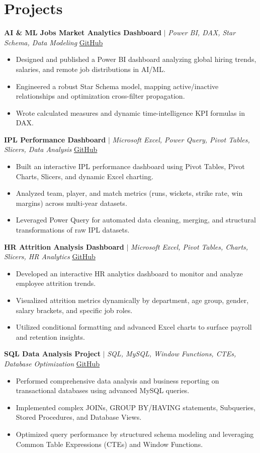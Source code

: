 \documentclass[a4paper,9pt]{article}
\newcommand{\resumeItem}[1]{\item\small #1}
\begin{document}
\vspace{-2mm}

\section{Projects}

\noindent\textbf{AI \& ML Jobs Market Analytics Dashboard} $|$ \textit{Power BI, DAX, Star Schema, Data Modeling} \hfill
\href{https://github.com/hsachan295-source/Power-BI-Portfolio}{\small GitHub}
\begin{itemize}
\resumeItem{Designed and published a Power BI dashboard analyzing global hiring trends, salaries, and remote job distributions in AI/ML.}
\resumeItem{Engineered a robust Star Schema model, mapping active/inactive relationships and optimization cross-filter propagation.}
\resumeItem{Wrote calculated measures and dynamic time-intelligence KPI formulas in DAX.}
\end{itemize}

\vspace{1.5pt}
\noindent\textbf{IPL Performance Dashboard} $|$ \textit{Microsoft Excel, Power Query, Pivot Tables, Slicers, Data Analysis} \hfill
\href{https://github.com/hsachan295-source/Power-BI-Portfolio}{\small GitHub}
\begin{itemize}
\resumeItem{Built an interactive IPL performance dashboard using Pivot Tables, Pivot Charts, Slicers, and dynamic Excel charting.}
\resumeItem{Analyzed team, player, and match metrics (runs, wickets, strike rate, win margins) across multi-year datasets.}
\resumeItem{Leveraged Power Query for automated data cleaning, merging, and structural transformations of raw IPL datasets.}
\end{itemize}

\vspace{1.5pt}
\noindent\textbf{HR Attrition Analysis Dashboard} $|$ \textit{Microsoft Excel, Pivot Tables, Charts, Slicers, HR Analytics} \hfill
\href{https://github.com/hsachan295-source/Power-BI-Portfolio}{\small GitHub}
\begin{itemize}
\resumeItem{Developed an interactive HR analytics dashboard to monitor and analyze employee attrition trends.}
\resumeItem{Visualized attrition metrics dynamically by department, age group, gender, salary brackets, and specific job roles.}
\resumeItem{Utilized conditional formatting and advanced Excel charts to surface payroll and retention insights.}
\end{itemize}

\vspace{1.5pt}
\noindent\textbf{SQL Data Analysis Project} $|$ \textit{SQL, MySQL, Window Functions, CTEs, Database Optimization} \hfill
\href{https://github.com/hsachan295-source/smart-business-dashboard}{\small GitHub}
\begin{itemize}
\resumeItem{Performed comprehensive data analysis and business reporting on transactional databases using advanced MySQL queries.}
\resumeItem{Implemented complex JOINs, GROUP BY/HAVING statements, Subqueries, Stored Procedures, and Database Views.}
\resumeItem{Optimized query performance by structured schema modeling and leveraging Common Table Expressions (CTEs) and Window Functions.}
\end{itemize}
\end{document}
